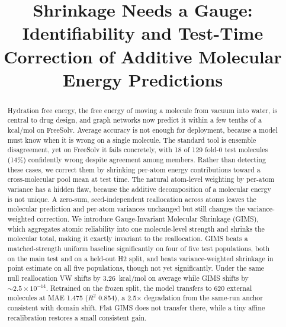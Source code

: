 \documentclass{article}
\title{Shrinkage Needs a Gauge: Identifiability and Test-Time Correction of Additive Molecular Energy Predictions}
\begin{document}
\maketitle

\begin{abstract}
  Hydration free energy, the free energy of moving a molecule from vacuum
  into water, is central to drug design, and graph networks now predict it
  within a few tenths of a kcal/mol on FreeSolv. Average accuracy is not
  enough for deployment, because a model must know when it is wrong on a
  single molecule. The standard tool is ensemble disagreement, yet on FreeSolv
  it fails concretely, with 18 of 129 fold-0 test molecules (14\%) confidently
  wrong despite agreement among members. Rather than detecting these cases, we
  correct them by shrinking per-atom energy contributions toward a
  cross-molecular pool mean at test time. The natural atom-level weighting by
  per-atom variance has a hidden flaw, because the additive decomposition of a
  molecular energy is not unique. A zero-sum, seed-independent reallocation
  across atoms leaves the molecular prediction and per-atom variances unchanged
  but still changes the variance-weighted correction. We introduce
  Gauge-Invariant Molecular Shrinkage (GIMS), which aggregates atomic
  reliability into one molecule-level strength and shrinks the molecular total,
  making it exactly invariant to the reallocation. GIMS beats a matched-strength
  uniform baseline significantly on four of five test populations, both on the
  main test and on a held-out H2 split, and beats variance-weighted shrinkage
  in point estimate on all five populations, though not yet significantly.
  Under the same null reallocation VW shifts by 3.26~kcal/mol on average while
  GIMS shifts by $\sim 2.5\times10^{-14}$. Retrained on the frozen split, the
  model transfers to 620 external molecules at MAE 1.475 ($R^2$ 0.854), a
  2.5$\times$ degradation from the same-run anchor consistent with domain shift.
  Flat GIMS does not transfer there, while a tiny affine recalibration restores
  a small consistent gain.
\end{abstract}
\end{document}
